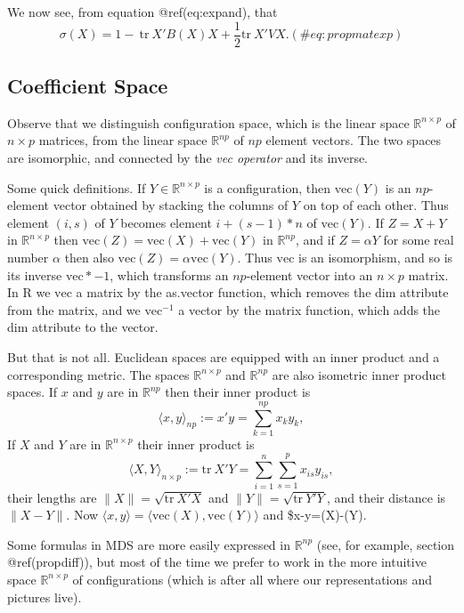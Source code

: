 \documentclass[
  12pt,
  letterpaper,
  DIV=11,
  numbers=noendperiod]{scrreprt}
\theoremstyle{remark}
\begin{document}
We now see, from equation @ref(eq:expand), that \begin{equation}
\sigma(X)=1-\ \text{tr}\ X'B(X)X+\frac12\text{tr}\ X'VX.
(\#eq:propmatexp)
\end{equation}

\subsection{Coefficient Space}\label{propcoefspace}

Observe that we distinguish configuration space, which is the linear
space \(\mathbb{R}^{n\times p}\) of \(n\times p\) matrices, from the
linear space \(\mathbb{R}^{np}\) of \(np\) element vectors. The two
spaces are isomorphic, and connected by the \emph{vec operator} and its
inverse.

Some quick definitions. If \(Y\in\mathbb{R}^{n\times p}\) is a
configuration, then \(\text{vec}(Y)\) is an \(np\)-element vector
obtained by stacking the columns of \(Y\) on top of each other. Thus
element \((i,s)\) of \(Y\) becomes element \(i+(s-1)*n\) of
\(\text{vec}(Y)\). If \(Z=X+Y\) in \(\mathbb{R}^{n\times p}\) then
\(\text{vec}(Z)=\text{vec}(X)+\text{vec}(Y)\) in \(\mathbb{R}^{np}\),
and if \(Z=\alpha Y\) for some real number \(\alpha\) then also
\(\text{vec}(Z)=\alpha\text{vec}(Y)\). Thus \(\text{vec}\) is an
isomorphism, and so is its inverse \(\text{vec}*{-1}\), which transforms
an \(np\)-element vector into an \(n\times p\) matrix. In R we
\(\text{vec}\) a matrix by the as.vector function, which removes the dim
attribute from the matrix, and we \(\text{vec}^{-1}\) a vector by the
matrix function, which adds the dim attribute to the vector.

But that is not all. Euclidean spaces are equipped with an inner product
and a corresponding metric. The spaces \(\mathbb{R}^{n\times p}\) and
\(\mathbb{R}^{np}\) are also isometric inner product spaces. If \(x\)
and \(y\) are in \(\mathbb{R}^{np}\) then their inner product is \[
\langle x, y\rangle_{np}:=x'y=\sum_{k=1}^{np}x_ky_k,
\] If \(X\) and \(Y\) are in \(\mathbb{R}^{n\times p}\) their inner
product is \[
\langle X,Y\rangle_{n\times p}:=\text{tr}\ X'Y=\sum_{i=1}^{n}\sum_{s=1}^px_{is}y_{is},
\] their lengths are \(\|X\|=\sqrt{\text{tr}\ X'X}\) and
\(\|Y\|=\sqrt{\text{tr}\ Y'Y}\), and their distance is \(\|X-Y\|\). Now
\(\langle x,y\rangle=\langle\text{vec}(X),\text{vec}(Y)\rangle\) and
\$\textbar x-y\textbar=\textbar{}(X)-(Y)\textbar.

Some formulas in MDS are more easily expressed in \(\mathbb{R}^{np}\)
(see, for example, section @ref(propdiff)), but most of the time we
prefer to work in the more intuitive space \(\mathbb{R}^{n\times p}\) of
configurations (which is after all where our representations and
pictures live).
\end{document}
